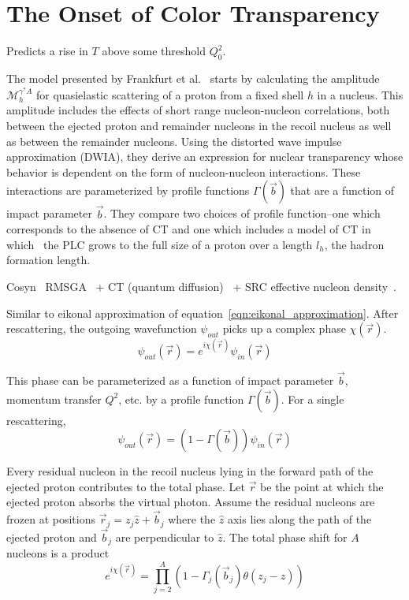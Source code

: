 \section{The Onset of Color Transparency}
Predicts a rise in $T$ above some threshold $Q^2_0$.

The model presented by Frankfurt et al.~\cite{Frankfurt_1995_PRC} starts by
calculating the amplitude $\mathcal{M}_{h}^{\gamma^*A}$ for quasielastic
scattering of a proton from a fixed shell $h$ in a nucleus.
This amplitude includes the effects of short range nucleon-nucleon
correlations, both between the ejected proton and remainder nucleons in the
recoil nucleus as well as between the remainder nucleons.
Using the distorted wave impulse approximation (DWIA), they derive an
expression for nuclear transparency whose behavior is dependent on the form of
nucleon-nucleon interactions.
These interactions are parameterized by profile functions $\Gamma(\vec{b})$
that are a function of impact parameter $\vec{b}$.
They compare two choices of profile function--one which corresponds to the
absence of CT and one which includes a model of CT in which~\cite{Farrar_1988}
the PLC grows to the full size of a proton over a length $l_h$, the hadron
formation length.


Cosyn~\cite{Cosyn_2008,Cosyn_2006} RMSGA~\cite{Ryckebusch_2003} + CT (quantum
diffusion)~\cite{Farrar_1988} + SRC effective nucleon
density~\cite{Frankel_1994}.


Similar to eikonal approximation of equation~\ref{eqn:eikonal_approximation}.
After rescattering, the outgoing wavefunction $\psi_{out}$ picks up a complex
phase $\chi(\vec{r})$.
\begin{equation}
    \psi_{out}(\vec{r}) = e^{i\chi(\vec{r})} \psi_{in}(\vec{r})
\end{equation}

This phase can be parameterized as a function of impact parameter $\vec{b}$,
momentum transfer $Q^2$, etc. by a profile function $\Gamma(\vec{b})$.
For a single rescattering,
\begin{equation}
    \psi_{out}(\vec{r}) = (1-\Gamma(\vec{b})) \psi_{in}(\vec{r})
\end{equation}

Every residual nucleon in the recoil nucleus lying in the forward path of the
ejected proton contributes to the total phase.
Let $\vec{r}$ be the point at which the ejected proton absorbs the virtual
photon.
Assume the residual nucleons are frozen at positions
$\vec{r}_j = z_j \hat{z} + \vec{b}_j$
where the $\hat{z}$ axis lies along the path of the ejected proton
and $\vec{b}_j$ are perpendicular to $\hat{z}$.
The total phase shift for $A$ nucleons is a product
\begin{equation}
    e^{i\chi(\vec{r})} = \prod_{j=2}^{A} \left(1-\Gamma_j(\vec{b}_j)\theta(z_j-z)\right)
\end{equation}

